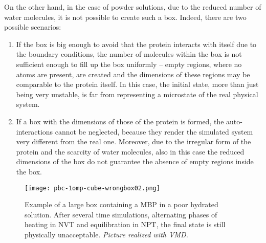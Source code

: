 On the other hand, in the case of powder solutions, due to the reduced number of water molecules, it is not possible to create such a box. Indeed, there are two possible scenarios:
\begin{enumerate}
\item If the box is big enough to avoid that the protein interacts with itself due to the boundary conditions, the number of molecules within the box is not sufficient enough to fill up the box uniformly – empty regions, where no atoms are present, are created and the dimensions of these regions may be comparable to the protein itself. In this case, the initial state, more than just being very unstable, is far from representing a microstate of the real physical system.
\item If a box with the dimensions of those of the protein is formed, the auto-interactions cannot be neglected, because they render the simulated system very different from the real one. Moreover, due to the irregular form of the protein and the scarcity of water molecules, also in this case the reduced dimensions of the box do not guarantee the absence of empty regions inside the box.
\end{enumerate}

\begin{figure}[H]
\centering
\begin{minipage}[t]{\textwidth}
	\centering
    \texttt{[image: pbc-1omp-cube-wrongbox02.png]}
    
    \footnotesize{\caption{Example of a large box containing a MBP in a poor hydrated solution. After several time simulations, alternating phases of heating in NVT and equilibration in NPT, the final state is still physically unacceptable. \textit{Picture realized with VMD.}}
    \label{fig:wrong-hydr}
    }
\end{minipage} 
\end{figure}

